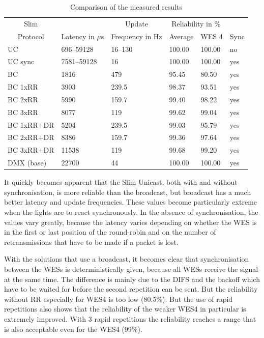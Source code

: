 \begin{table}[h]
	\centering
	\begin{tabular} { llllll }
	\toprule
	\multicolumn{1}{c}{Slim}
	& \multicolumn{1}{c}{}
	& \multicolumn{1}{c}{Update}
	& \multicolumn{2}{c}{Reliability in \%} 
	& \multicolumn{1}{c}{} \\

	\multicolumn{1}{c}{Protocol}
	& \multicolumn{1}{c}{Latency in $\mu$s}
	& \multicolumn{1}{c}{Frequency in Hz}
	& \multicolumn{1}{c}{Average}
	& \multicolumn{1}{c}{WES 4}
	& \multicolumn{1}{c}{Sync} \\

	\midrule
	UC        &  696–59128 & 16–130  & 100.00 & 100.00 & no \\
	UC sync   & 7581–59128 & 16      & 100.00 & 100.00 & yes \\
	BC        &  1816      & 479     & 95.45  & 80.50  & yes \\
	BC 1xRR   &  3903      & 239.5   & 98.37  & 93.51  & yes \\
	BC 2xRR   &  5990      & 159.7   & 99.40  & 98.22  & yes \\
	BC 3xRR   &  8077      & 119     & 99.62  & 99.04  & yes \\
	BC 1xRR+DR&  5204      & 239.5   & 99.03  & 95.79  & yes \\
	BC 2xRR+DR&  8386      & 159.7   & 99.36  & 97.64  & yes \\
	BC 3xRR+DR&  11538     & 119     & 99.68  & 99.20  & yes \\
	DMX (base)&  22700     & 44      & 100.00 & 100.00 & yes \\
	\bottomrule
	\end{tabular}
	\caption{Comparison of the measured results}
	\label{tab:results}
\end{table}

It quickly becomes apparent that the Slim Unicast, both with and without synchronisation, 
is more reliable than the broadcast, but broadcast has a much better latency and update frequencies.
These values become particularly extreme when the lights are to react synchronously.
In the absence of synchronisation, the values vary greatly, 
because the latency varies depending on whether the WES is in the first or last position of the round-robin
and on the number of retransmissions that have to be made if a packet is lost.

With the solutions that use a broadcast, 
it becomes clear that synchronisation between the WESs is deterministically given,
because all WESs receive the signal at the same time.
The difference is mainly due to the DIFS and the backoff 
which have to be waited for before the second repetition can be sent.
But the reliability without RR especially for WES4 is too low (80.5\%).
But the use of rapid repetitions also shows that the reliability of the weaker WES4 in particular is extremely improved.
With 3 rapid repetitions the reliability reaches a range that is also acceptable even for the WES4 (99\%).

